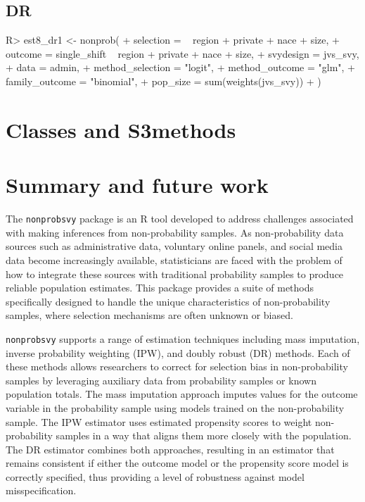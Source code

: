 \documentclass[
]{jss}
\begin{document}
\hypertarget{dr}{%
\subsection{DR}\label{dr}}

\begin{CodeChunk}
\begin{CodeInput}
R> est8_dr1 <- nonprob(
+   selection = ~ region + private + nace + size,
+   outcome = single_shift ~ region + private + nace + size,
+   svydesign = jvs_svy,
+   data = admin,
+   method_selection = "logit",
+   method_outcome = "glm",
+   family_outcome = "binomial",
+   pop_size = sum(weights(jvs_svy))
+ )
\end{CodeInput}
\end{CodeChunk}

\hypertarget{classes-and-s3methods}{%
\section{Classes and S3methods}\label{classes-and-s3methods}}

\hypertarget{summary-and-future-work}{%
\section{Summary and future work}\label{summary-and-future-work}}

The \texttt{nonprobsvy} package is an R tool developed to address
challenges associated with making inferences from non-probability
samples. As non-probability data sources such as administrative data,
voluntary online panels, and social media data become increasingly
available, statisticians are faced with the problem of how to integrate
these sources with traditional probability samples to produce reliable
population estimates. This package provides a suite of methods
specifically designed to handle the unique characteristics of
non-probability samples, where selection mechanisms are often unknown or
biased.

\texttt{nonprobsvy} supports a range of estimation techniques including
mass imputation, inverse probability weighting (IPW), and doubly robust
(DR) methods. Each of these methods allows researchers to correct for
selection bias in non-probability samples by leveraging auxiliary data
from probability samples or known population totals. The mass imputation
approach imputes values for the outcome variable in the probability
sample using models trained on the non-probability sample. The IPW
estimator uses estimated propensity scores to weight non-probability
samples in a way that aligns them more closely with the population. The
DR estimator combines both approaches, resulting in an estimator that
remains consistent if either the outcome model or the propensity score
model is correctly specified, thus providing a level of robustness
against model misspecification.
\end{document}
